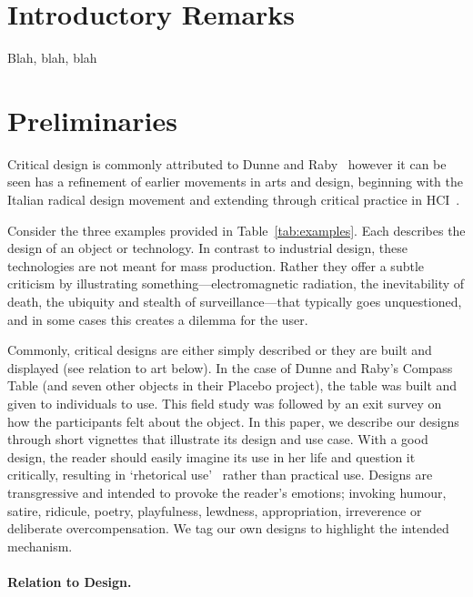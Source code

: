 
\section{Introductory Remarks}

Blah, blah, blah

\section{Preliminaries}



Critical design is commonly attributed to Dunne and Raby~\cite{DuRa01,Dun05} however it can be seen has a refinement of earlier movements in arts and design, beginning with the Italian radical design movement and extending through critical practice in HCI~\cite{Mal17}. 

Consider the three examples provided in Table~\ref{tab:examples}. Each describes the design of an object or technology. In contrast to industrial design, these technologies are not meant for mass production. Rather they offer a subtle criticism by illustrating something---electromagnetic radiation, the inevitability of death, the ubiquity and stealth of surveillance---that typically goes unquestioned, and in some cases this creates a dilemma for the user.

Commonly, critical designs are either simply described or they are built and displayed (see relation to art below). In the case of Dunne and Raby's Compass Table (and seven other objects in their Placebo project), the table was built and given to individuals to use. This field study was followed by an exit survey on how the participants felt about the object. In this paper, we describe our designs through short vignettes that illustrate its design and use case. With a good design, the reader should easily imagine its use in her life and question it critically, resulting in `rhetorical use'~\cite{Mal17} rather than practical use. Designs are transgressive and intended to provoke the reader's emotions; invoking humour, satire, ridicule, poetry, playfulness, lewdness, appropriation, irreverence or deliberate overcompensation. We tag our own designs to highlight the intended mechanism.

\paragraph{Relation to Design.}

